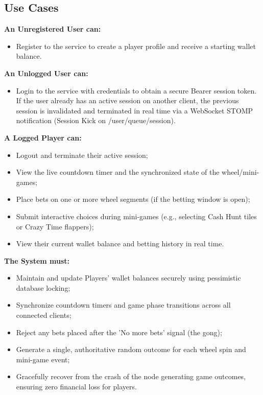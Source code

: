 \documentclass[12pt,a4paper]{article}
\begin{document}
\subsection{Use Cases}
\textbf{An Unregistered User can:}
\begin{itemize}
    \item Register to the service to create a player profile and receive a starting wallet balance.
\end{itemize}
\textbf{An Unlogged User can:}
\begin{itemize}
    \item Login to the service with credentials to obtain a secure Bearer session token. If the user already has an active session on another client, the previous session is invalidated and terminated in real time via a WebSocket STOMP notification (Session Kick on /user/queue/session).
\end{itemize}
\textbf{A Logged Player can:}
\begin{itemize}
    \item Logout and terminate their active session;
    \item View the live countdown timer and the synchronized state of the wheel/mini-games;
    \item Place bets on one or more wheel segments (if the betting window is open);
    \item Submit interactive choices during mini-games (e.g., selecting Cash Hunt tiles or Crazy Time flappers);
    \item View their current wallet balance and betting history in real time.
\end{itemize}
\textbf{The System must:}
\begin{itemize}
    \item Maintain and update Players' wallet balances securely using pessimistic database locking;
    \item Synchronize countdown timers and game phase transitions across all connected clients;
    \item Reject any bets placed after the 'No more bets' signal (the gong);
    \item Generate a single, authoritative random outcome for each wheel spin and mini-game event;
    \item Gracefully recover from the crash of the node generating game outcomes, ensuring zero financial loss for players.
\end{itemize}
\end{document}
